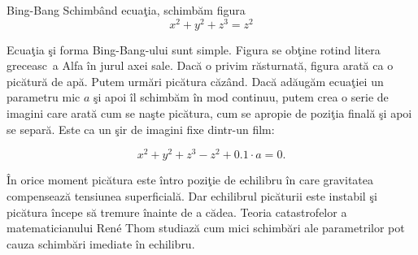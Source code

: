 \begin{surferPage}{Bing-Bang}
Schimb\^and ecua\c tia, schimb\u am figura \\

\smallskip
\[x^2	+ y^2	+ z^3	= z^2\]

\singlespacing
Ecua\c tia \c si forma Bing-Bang-ului sunt simple. Figura se ob\c tine rotind litera greceasc\ a Alfa \^in jurul axei sale. Dac\u a o privim
r\u asturnat\u a, figura arat\u a ca o pic\u atur\u a de ap\u a. Putem urm\u ari pic\u atura c\u az\^and.
\newline
Dac\u a ad\u aug\u am ecua\c tiei un parametru mic $a$ \c si apoi \^il schimb\u am  \^in mod continuu, putem crea o serie de imagini care arat\u a
cum se na\c ste pic\u atura, cum se apropie de pozi\c tia final\u a \c si apoi se separ\u a. Este ca un \c sir de imagini fixe dintr-un film: 

\[x^2	+ y^2	+ z^3	-z^2+0.1\cdot a=0.\]

\^In orice moment pic\u atura este \^intro pozi\c tie de echilibru \^in care gravitatea compenseaz\u a tensiunea superficial\u a. Dar echilibrul pic\u aturii
este instabil \c si pic\u atura \^incepe s\u a tremure \^inainte de a c\u adea. Teoria catastrofelor a matematicianului Ren\'e Thom studiaz\u a cum
mici schimb\u ari ale parametrilor pot cauza schimb\u ari imediate \^in echilibru.

\end{surferPage}
